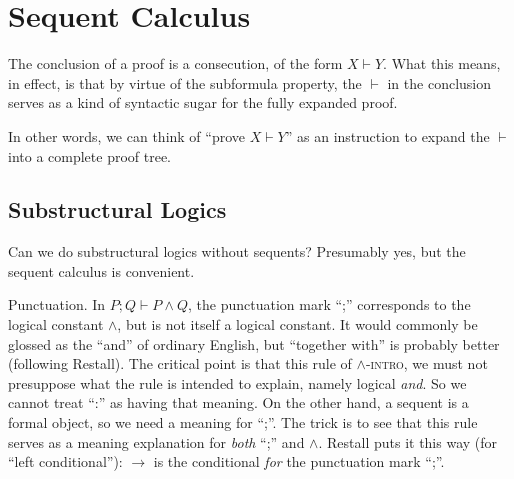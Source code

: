 \documentclass{article}
\begin{document}
\section{Sequent Calculus}

The conclusion of a proof is a consecution, of the form \(X\vdash Y\).
What this means, in effect, is that by virtue of the subformula
property, the \(\vdash\) in the conclusion serves as a kind of
syntactic sugar for the fully expanded proof.

In other words, we can think of ``prove \(X\vdash Y\)'' as an
instruction to expand the \(\vdash\) into a complete proof tree.

\subsection{Substructural Logics}

\begin{remark}
  Can we do substructural logics without sequents?  Presumably yes,
  but the sequent calculus is convenient.
\end{remark}

\begin{remark}
  Punctuation.  In \(P;Q\vdash P\land Q\), the punctuation mark ``;''
  corresponds to the logical constant \(\land\), but is not itself a
  logical constant.  It would commonly be glossed as the ``and'' of
  ordinary English, but ``together with'' is probably better
  (following Restall).  The critical point is that this rule of
  \(\land\)-\textsc{intro}, we must not presuppose what the rule is
  intended to explain, namely logical \emph{and}.  So we cannot treat
  ``:'' as having that meaning.  On the other hand, a sequent is a
  formal object, so we need a meaning for ``;''.  The trick is to see
  that this rule serves as a meaning explanation for \emph{both} ``;''
  and \(\land\).  Restall puts it this way (for ``left conditional''):
  \(\to\) is the conditional \emph{for} the punctuation mark ``;''.
\end{remark}
\end{document}

